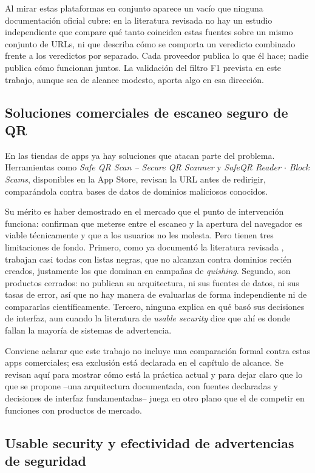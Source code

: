 Al mirar estas plataformas en conjunto aparece un vacío que ninguna documentación
oficial cubre: en la literatura revisada no hay un estudio independiente que compare
qué tanto coinciden estas fuentes sobre un mismo conjunto de URLs, ni que describa cómo
se comporta un veredicto combinado frente a los veredictos por separado. Cada proveedor
publica lo que él hace; nadie publica cómo funcionan juntos. La validación del filtro F1
prevista en este trabajo, aunque sea de alcance modesto, aporta algo en esa
dirección.

\subsection{Soluciones comerciales de escaneo seguro de QR}

En las tiendas de apps ya hay soluciones que atacan parte del problema. Herramientas
como \emph{Safe QR Scan -- Secure QR Scanner} y \emph{SafeQR Reader $\cdot$ Block Scams},
disponibles en la App Store, revisan la URL antes de redirigir, comparándola contra
bases de datos de dominios maliciosos conocidos.

Su mérito es haber demostrado en el mercado que el punto de intervención funciona:
confirman que meterse entre el escaneo y la apertura del navegador es viable
técnicamente y que a los usuarios no les molesta. Pero tienen tres limitaciones de
fondo. Primero, como ya documentó la literatura revisada
\cite{sheng2009empirical,vidas2013qrishing}, trabajan casi todas con listas negras, que
no alcanzan contra dominios recién creados, justamente los que dominan en campañas de
\emph{quishing}. Segundo, son productos cerrados: no publican su arquitectura, ni sus
fuentes de datos, ni sus tasas de error, así que no hay manera de evaluarlas de forma
independiente ni de compararlas científicamente. Tercero, ninguna explica en qué basó
sus decisiones de interfaz, aun cuando la literatura de \emph{usable security} dice que
ahí es donde fallan la mayoría de sistemas de advertencia.

Conviene aclarar que este trabajo no incluye una comparación formal contra estas
apps comerciales; esa exclusión está declarada en el capítulo de alcance. Se revisan
aquí para mostrar cómo está la práctica actual y para dejar claro que lo que se propone
--una arquitectura documentada, con fuentes declaradas y decisiones de interfaz
fundamentadas-- juega en otro plano que el de competir en funciones con productos de
mercado.

\subsection{Usable security y efectividad de advertencias de seguridad}

